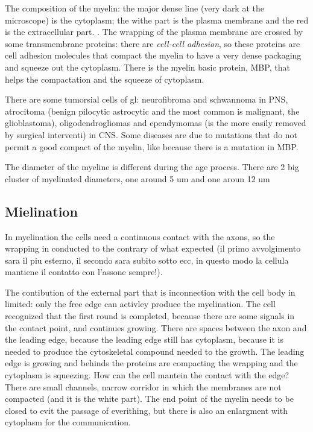 \documentclass[a4paper, 12pt]{book}
\begin{document}
The composition of the myelin: the major dense line (very dark at the microscope) is the cytoplasm; the withe part is the plasma membrane and the red is the extracellular part. . The wrapping of the plasma membrane are crossed by some transmembrane proteins: there are \emph{cell-cell adhesion}, so these proteins are cell adhesion molecules that compact the myelin to have a very dense packaging and squeeze out the cytoplasm. There is the myelin basic protein, MBP, that helps the compactation and the squeeze of cytoplasm.

There are some tumorsial cells of gl: neurofibroma and schwannoma in PNS, atrocitoma (benign pilocytic astrocytic and the most common is malignant, the glioblastoma), oligodendrogliomas and ependymomas (is the more easily removed by surgical interventi) in CNS. Some diseases are due to mutations that do not permit a good compact of the myelin, like because there is a mutation in MBP. 

The diameter of the myeline is different during the age process. There are 2 big cluster of myelinated diameters, one around 5 um and one aroun 12 um

\subsection{Mielination}

In myelination the cells need a continuous contact with the axons, so the wrapping in conducted to the contrary of what expected (il primo avvolgimento sara il piu esterno, il secondo sara subito sotto ecc, in questo modo la cellula mantiene il contatto con l'assone sempre!).

The contibution of the external part that is inconnection with the cell body in limited: only the free edge can activley produce the myelination. The cell recognized that the first round is completed, because there are some signals in the contact point, and continues growing. There are spaces between the axon and the leading edge, because the leading edge still has cytoplasm, because it is needed to produce the cytoskeletal compound needed to the growth. The leading edge is growing and behinds the proteins are compacting the wrapping and the cytoplasm is squeezing. How can the cell mantein the contact with the edge? There are small channels, narrow corridor in which the membranes are not compacted (and it is the white part). The end point of the myelin needs to be closed to evit the passage of everithing, but there is also an enlargment with cytoplasm for the communication. 
\end{document}
